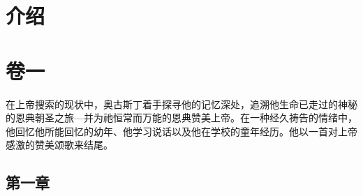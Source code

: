 \documentclass[12pt, a4paper, oneside]{ctexart}
\begin{document}
\newpage
{}
\setcounter{page}{1}
\tableofcontents
\newpage
\setcounter{page}{1}

\section*{介绍}


\newpage

\section{卷一}

在上帝搜索的现状中，奥古斯丁着手探寻他的记忆深处，追溯他生命已走过的神秘的恩典朝圣之旅---并为祂恒常而万能的恩典赞美上帝。在一种经久祷告的情绪中，他回忆他所能回忆的幼年、他学习说话以及他在学校的童年经历。他以一首对上帝感激的赞美颂歌来结尾。

\subsection{第一章}
\end{document}
